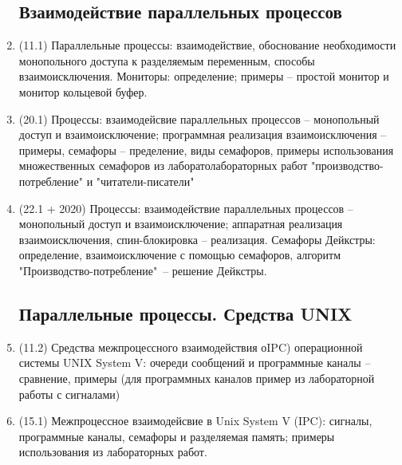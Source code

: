 \documentclass[a4paper,14pt]{extreport}
\begin{document}
\begin{enumerate}
\subsection{Взаимодействие параллельных процессов}
    \item (11.1) Параллельные процессы: взаимодействие, обоснование
        необходимости монопольного доступа к разделяемым переменным, способы
        взаимоисключения. Мониторы: определение; примеры -- простой
        монитор и монитор кольцевой буфер.
    \item (20.1) Процессы: взаимодейсвие параллельных процессов --
        монопольный доступ и взаимоисключение; программная
        реализация взаимоисключения -- примеры, семафоры -- пределение,
        виды семафоров, примеры использования множественных семафоров из
        лаборатолабораторных работ "производство-потребление" и
        "читатели-писатели"
    \item (22.1 + 2020) Процессы: взаимодействие параллельных процессов --
        монопольный доступ и взаимоисключение; аппаратная
        реализация взаимоисключения, спин-блокировка -- реализация. Семафоры
        Дейкстры: определение, взаимоисключение с помощью
        семафоров, алгоритм "Производство-потребление"\ -- решение Дейкстры.

\subsection{Параллельные процессы. Средства UNIX}
    \item (11.2) Средства межпроцессного взаимодействия оIPC) операционной
        системы UNIX System V: очереди сообщений и программные каналы --
        сравнение, примеры (для программных каналов пример из лабораторной
        работы с сигналами)
    \item (15.1) Межпроцессное взаимодейсвие в Unix System V (IPC): сигналы,
        программные каналы, семафоры и разделяемая память; примеры
        использования из лабораторных работ.

        

\end{enumerate}
\end{document}
